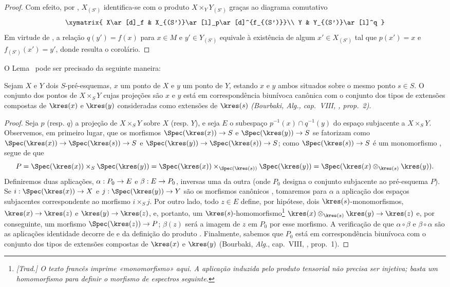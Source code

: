 \documentclass[oneside]{amsart}
\makeatletter
\newcommand{\ega@arrow}[2]{\mathchoice{#1}{#2}{#2}{#2}}
\renewcommand{\to}{\ega@arrow{\longrightarrow}{\rightarrow}}
\newcommand{\oldpage}[2][]{{\marginnote{\normalfont\textbf{#1}~|~#2}}\ignorespaces}
\let\EGAOriginalLabel\label
\renewcommand{\label}[1]{\phantomsection\EGAOriginalLabel{#1}}
\makeatother
\begin{document}
\oldpage[I]{114}
\begin{proof}
Com efeito, por , $X_{(S')}$ identifica-se com o produto
$X\times_Y Y_{(S')}$ graças ao diagrama comutativo
\[
  \xymatrix{
    X\ar[d]_f &
    X_{(S')}\ar[l]_p\ar[d]^{f_{(S')}}\\
    Y &
    Y_{(S')}\ar[l]^q
  }
\]
Em virtude de , a relação $q(y')=f(x)$ para $x\in M$ e
$y'\in Y_{(S')}$ equivale à existência de algum $x'\in X_{(S')}$ tal que
$p(x')=x$ e $f_{(S')}(x')=y'$, donde resulta o corolário.
\end{proof}

O Lema~ pode ser precisado da seguinte maneira:

\begin{proposition}[3.4.9]
\label{I.3.4.9}
Sejam $X$ e $Y$ dois $S$-pré-esquemas, $x$ um ponto de $X$ e $y$ um ponto de
$Y$, estando $x$ e $y$ ambos situados sobre o mesmo ponto $s\in S$.
O conjunto dos pontos de $X\times_S Y$ cujas projeções são $x$ e $y$ está em
correspondência biunívoca canônica com o conjunto dos tipos de extensões
compostas de $\kres(x)$ e $\kres(y)$ consideradas como extensões de $\kres(s)$
\emph{(Bourbaki, \emph{Alg.}, cap.~VIII, , prop.~2)}.
\end{proposition}

\begin{proof}
Seja $p$ (resp. $q$) a projeção de $X\times_S Y$ sobre $X$ (resp. $Y$), e seja
$E$ o subespaço $p^{-1}(x)\cap q^{-1}(y)$ do espaço subjacente a
$X\times_S Y$.
Observemos, em primeiro lugar, que os morfismos $\Spec(\kres(x))\to S$ e
$\Spec(\kres(y))\to S$ se fatorizam como
$\Spec(\kres(x))\to\Spec(\kres(s))\to S$ e
$\Spec(\kres(y))\to\Spec(\kres(s))\to S$; como
$\Spec(\kres(s))\to S$ é um monomorfismo , segue de
 que
\[
  P=\Spec(\kres(x))\times_S\Spec(\kres(y))=\Spec(\kres(x))\times_{\Spec(\kres(s))}\Spec(\kres(y))=\Spec(\kres(x)\otimes_{\kres(s)}\kres(y)).
\]
Definiremos duas aplicações, $\alpha:P_0\to E$ e $\beta:E\to P_0$, inversas
uma da outra (onde $P_0$ designa o conjunto subjacente ao pré-esquema $P$).
Se $i:\Spec(\kres(x))\to X$ e $j:\Spec(\kres(y))\to Y$ são os morfismos
canônicos , tomaremos para $\alpha$ a aplicação dos espaços
subjacentes correspondente ao morfismo $i\times_S j$.
Por outro lado, todo $z\in E$ define, por hipótese, dois
$\kres(s)$-monomorfismos, $\kres(x)\to\kres(z)$ e $\kres(y)\to\kres(z)$, e,
portanto, um $\kres(s)$-homomorfismo\footnote{\emph{[Trad.] O texto francês
imprime «monomorfismo» aqui. A aplicação induzida pelo produto tensorial não
precisa ser injetiva; basta um homomorfismo para definir o morfismo de espectros
seguinte.}} $\kres(x)\otimes_{\kres(s)}\kres(y)\to\kres(z)$ e, por
conseguinte, um morfismo $\Spec(\kres(z))\to P$; $\beta(z)$ será a imagem de
$z$ em $P_0$ por esse morfismo.
A verificação de que $\alpha\circ\beta$ e $\beta\circ\alpha$ são as aplicações
identidade decorre de  e da definição do produto
.
Finalmente, sabemos que $P_0$ está em correspondência biunívoca com o conjunto
dos tipos de extensões compostas de $\kres(x)$ e $\kres(y)$ (Bourbaki,
\emph{Alg.}, cap.~VIII, , prop.~1).
\end{proof}
\end{document}
